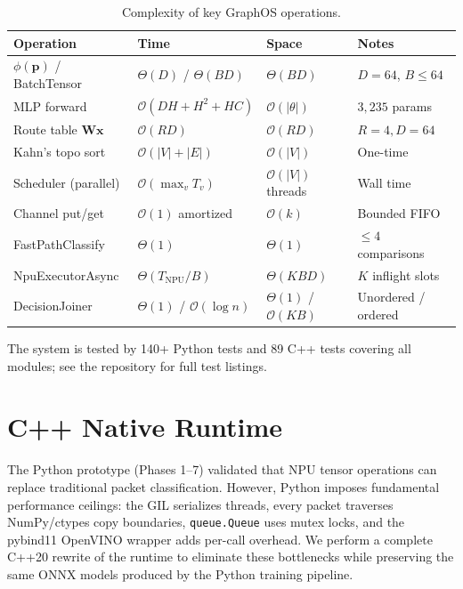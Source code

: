 \documentclass[11pt,a4paper,twoside]{article}
\theoremstyle{definition}
\theoremstyle{remark}
\newcommand{\BigO}{\mathcal{O}}
\newcommand{\mat}[1]{\mathbf{#1}}
\newcommand{\vect}[1]{\mathbf{#1}}
\begin{document}
\begin{table}[H]
\centering
\small
\begin{tabular}{llll}
\toprule
\textbf{Operation} & \textbf{Time} & \textbf{Space} & \textbf{Notes} \\
\midrule
$\phi(\vect{p})$ / BatchTensor & $\Theta(D)$ / $\Theta(BD)$ & $\Theta(BD)$ & $D{=}64$, $B{\leq}64$ \\
MLP forward & $\BigO(DH + H^2 + HC)$ & $\BigO(|\theta|)$ & $3{,}235$ params \\
Route table $\mat{W}\vect{x}$ & $\BigO(RD)$ & $\BigO(RD)$ & $R{=}4, D{=}64$ \\
Kahn's topo sort & $\BigO(|V| + |E|)$ & $\BigO(|V|)$ & One-time \\
Scheduler (parallel) & $\BigO(\max_v T_v)$ & $\BigO(|V|)$ threads & Wall time \\
Channel put/get & $\BigO(1)$ amortized & $\BigO(k)$ & Bounded FIFO \\
FastPathClassify & $\Theta(1)$ & $\Theta(1)$ & $\leq 4$ comparisons \\
NpuExecutorAsync & $\Theta(T_{\text{NPU}}/B)$ & $\Theta(KBD)$ & $K$ inflight slots \\
DecisionJoiner & $\Theta(1)$ / $\BigO(\log n)$ & $\Theta(1)$ / $\BigO(KB)$ & Unordered / ordered \\
\bottomrule
\end{tabular}
\caption{Complexity of key GraphOS operations.}
\label{tab:complexity}
\end{table}

The system is tested by 140+ Python tests and 89 C++ tests covering all modules; see the repository for full test listings.


\section{C++ Native Runtime}
\label{sec:cpp}

The Python prototype (Phases 1--7) validated that NPU tensor operations can replace traditional packet classification. However, Python imposes fundamental performance ceilings: the GIL serializes threads, every packet traverses NumPy/ctypes copy boundaries, \texttt{queue.Queue} uses mutex locks, and the pybind11 OpenVINO wrapper adds per-call overhead. We perform a complete C++20 rewrite of the runtime to eliminate these bottlenecks while preserving the same ONNX models produced by the Python training pipeline.
\end{document}
